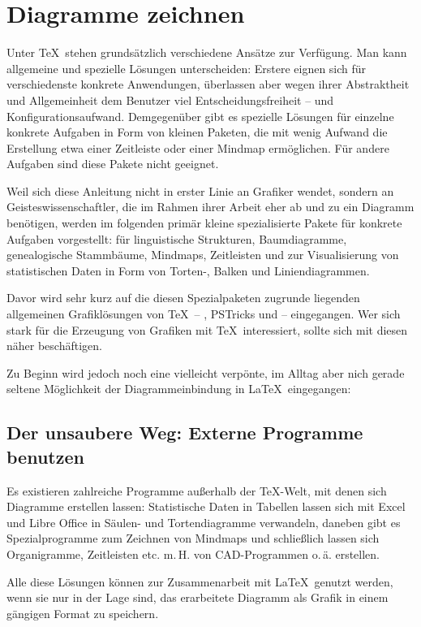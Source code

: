 \chapter{Diagramme zeichnen}

Unter \TeX\ stehen grundsätzlich verschiedene Ansätze zur Verfügung. 
Man kann allgemeine und spezielle Lösungen unterscheiden:
Erstere eignen sich für verschiedenste konkrete Anwendungen, überlassen aber wegen ihrer Abstraktheit 
und Allgemeinheit dem Benutzer viel Entscheidungsfreiheit -- und Konfigurationsaufwand. 
Demgegenüber gibt es spezielle Lösungen für einzelne konkrete Aufgaben in Form von kleinen Paketen,
die mit wenig Aufwand die Erstellung etwa einer Zeitleiste oder einer Mindmap ermöglichen.
Für andere Aufgaben sind diese Pakete nicht geeignet.

Weil sich diese Anleitung nicht in erster Linie an Grafiker wendet, sondern an Geisteswissenschaftler,
die im Rahmen ihrer Arbeit eher ab und zu ein Diagramm benötigen, werden im folgenden primär
kleine spezialisierte Pakete für konkrete Aufgaben vorgestellt: 
für linguistische Strukturen,
Baumdiagramme,
genealogische Stammbäume,
Mindmaps,
Zeitleisten 
und zur Visualisierung von statistischen Daten in Form von Torten-, Balken und Liniendiagrammen.

Davor wird sehr kurz auf die diesen Spezialpaketen zugrunde liegenden allgemeinen Grafiklösungen
von \TeX\ -- \METAPOST, PSTricks und \TikZ{} -- eingegangen. Wer sich stark für die Erzeugung von Grafiken
mit \TeX\ interessiert, sollte sich mit diesen näher beschäftigen.

Zu Beginn wird jedoch noch eine vielleicht verpönte, im Alltag aber nich gerade seltene Möglichkeit
der Diagrammeinbindung in \LaTeX\ eingegangen: 

\section{Der unsaubere Weg: Externe Programme benutzen}
Es existieren zahlreiche Programme außerhalb der \TeX-Welt, mit denen sich Diagramme erstellen 
lassen: Statistische Daten in Tabellen lassen sich mit Excel und Libre Office in Säulen- und 
Tortendiagramme verwandeln, daneben gibt es Spezialprogramme zum Zeichnen von Mindmaps
und schließlich lassen sich Organigramme, Zeitleisten etc. m.\,H. von CAD-Programmen o.\,ä.
erstellen.

Alle diese Lösungen können zur Zusammenarbeit mit \LaTeX\ genutzt werden, wenn sie nur in der 
Lage sind, das erarbeitete Diagramm als Grafik in einem gängigen Format zu speichern.

